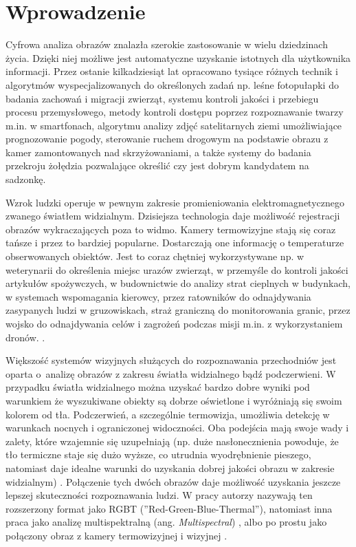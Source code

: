 \chapter{Wprowadzenie}

Cyfrowa analiza obrazów znalazła szerokie zastosowanie w wielu dziedzinach życia.
Dzięki niej możliwe jest automatyczne uzyskanie istotnych dla użytkownika informacji.
Przez ostanie kilkadziesiąt lat opracowano tysiące różnych technik i algorytmów wyspecjalizowanych do określonych zadań np. leśne fotopułapki do badania zachowań i migracji zwierząt, systemu kontroli jakości i przebiegu procesu przemysłowego, metody kontroli dostępu poprzez rozpoznawanie twarzy m.in. w smartfonach, algorytmu analizy zdjęć satelitarnych ziemi umożliwiające prognozowanie pogody, sterowanie ruchem drogowym na podstawie obrazu z kamer zamontowanych nad skrzyżowaniami, a także systemy do badania przekroju żołędzia pozwalające określić czy jest dobrym kandydatem na sadzonkę.

Wzrok ludzki operuje w pewnym zakresie promieniowania elektromagnetycznego zwanego światłem widzialnym.
Dzisiejsza technologia daje możliwość rejestracji obrazów wykraczających poza to widmo.
Kamery termowizyjne stają się coraz tańsze i przez to bardziej popularne.
Dostarczają one informację o temperaturze obserwowanych obiektów.
Jest to coraz chętniej wykorzystywane np. w weterynarii do określenia miejsc urazów zwierząt, w przemyśle do kontroli jakości artykułów spożywczych, w budownictwie do analizy strat cieplnych w budynkach, w systemach wspomagania kierowcy, przez ratowników do odnajdywania zasypanych ludzi w gruzowiskach, straż graniczną do monitorowania granic, przez wojsko do odnajdywania celów i zagrożeń podczas misji m.in. z wykorzystaniem dronów. \cite{gade2014thermal}.

Większość systemów wizyjnych służących do rozpoznawania przechodniów jest oparta o~analizę obrazów z zakresu światła widzialnego bądź podczerwieni.
W przypadku światła widzialnego można uzyskać bardzo dobre wyniki pod warunkiem że wyszukiwane obiekty są dobrze oświetlone i wyróżniają się swoim kolorem od tła.
Podczerwień, a szczególnie termowizja, umożliwia detekcję w warunkach nocnych i ograniczonej widoczności.
Oba podejścia mają swoje wady i zalety, które wzajemnie się uzupełniają (np. duże nasłonecznienia powoduje, że tło termiczne staje się dużo wyższe, co utrudnia wyodrębnienie pieszego, natomiast daje idealne warunki do uzyskania dobrej jakości obrazu w zakresie widzialnym) \cite{lee2015robust}.
Połączenie tych dwóch obrazów daje możliwość uzyskania jeszcze lepszej skuteczności rozpoznawania ludzi.
W pracy \cite{st2007combination} autorzy nazywają ten rozszerzony format jako RGBT (''Red-Green-Blue-Thermal''), natomiast inna praca jako analizę multispektralną (ang. \textit{Multispectral}) \cite{hwang2015multispectral}, albo po prostu jako połączony obraz z kamery termowizyjnej i wizyjnej \cite{lee2015robust}.

